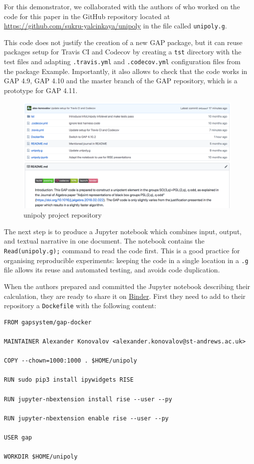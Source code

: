 \documentclass{deliverablereport}
\begin{document}
For this demonstrator, we collaborated with the authors of \cite{black-box} 
who worked on the code for this paper in the GitHub repository located 
at \url{https://github.com/sukru-yalcinkaya/unipoly} in the file 
called {\tt unipoly.g}.

This code does not justify the creation of a new GAP package, 
but it can reuse packages setup for Travis CI and Codecov by 
creating a {\tt tst} directory with the test files and adapting
{\tt .travis.yml} and {\tt .codecov.yml} configuration files
from the \GAP package {\sf Example}. Importantly, it also
allows to check that the code works in GAP 4.9, GAP 4.10 and 
the master branch of the GAP repository, which is a prototype for
GAP 4.11.

\begin{figure}[!ht]
    \centering
    \includegraphics[width=\textwidth]{images/unipoly-repo}
    \caption{unipoly project repository}
    \label{fig:unipoly-repo}
\end{figure}

The next step is to produce a Jupyter notebook which combines input,
output, and textual narrative in one document. The notebook contains
the {\tt Read(unipoly.g);} command to read the code first. This is
a good practice for organising reproducible experiments: keeping the
code in a single location in a {\tt .g} file allows its reuse and
automated testing, and avoids code duplication. 

When the authors prepared and committed the Jupyter notebook describing
their calculation, they are ready to share it on
\href{https://mybinder.org/}{Binder}. First they need to add 
to their repository a {\tt Dockefile} with the following content:

{\tiny
\begin{verbatim}
FROM gapsystem/gap-docker

MAINTAINER Alexander Konovalov <alexander.konovalov@st-andrews.ac.uk>

COPY --chown=1000:1000 . $HOME/unipoly

RUN sudo pip3 install ipywidgets RISE

RUN jupyter-nbextension install rise --user --py

RUN jupyter-nbextension enable rise --user --py

USER gap

WORKDIR $HOME/unipoly
\end{verbatim}
}
\end{document}
